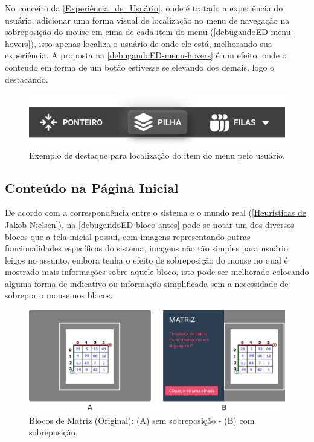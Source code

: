 No conceito da \autoref{Experiência_de_Usuário}, onde é tratado a experiência do usuário, adicionar uma forma visual de localização no menu de navegação na sobreposição do mouse em cima de cada item do menu (\autoref{debugandoED-menu-hovers}), isso apenas localiza o usuário de onde ele está, melhorando sua experiência. A proposta na \autoref{debugandoED-menu-hovers} é um efeito, onde o conteúdo em forma de um botão estivesse se elevando dos demais, logo o destacando.

\begin{figure}[htb]
    \begin{center}
        \includegraphics[scale=1]{figs/debugandoED-menu-hover.png}
    \end{center}
    \caption{\label{debugandoED-menu-hovers}Exemplo de destaque para localização do item do menu pelo usuário.}
\end{figure}

\subsection{Conteúdo na Página Inicial}
\label{Conteúdo_na_Pagina_Inicial}

De acordo com a correspondência entre o sistema e o mundo real (\autoref{Heurísticas de Jakob Nielsen}), na \autoref{debugandoED-bloco-antes} pode-se notar um dos diversos blocos que a tela inicial possui, com imagens representando outras funcionalidades específicas do sistema, imagens não tão simples para usuário leigos no assunto, embora tenha o efeito de sobreposição do mouse no qual é mostrado mais informações sobre aquele bloco, isto pode ser melhorado colocando alguma forma de indicativo ou informação simplificada sem a necessidade de sobrepor o mouse nos blocos.
    
\begin{figure}[htb]
    \begin{center}
	    \includegraphics[scale=0.52]{figs/debugandoED-bloco-antes.png}
	\end{center}
    \caption{\label{debugandoED-bloco-antes}Blocos de Matriz (Original): (A) sem sobreposição - (B) com sobreposição.}
\end{figure}
    
